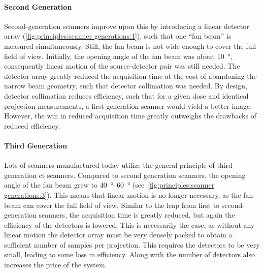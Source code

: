\documentclass[../ml-tct.tex]{subfiles}
\begin{document}
\paragraph{Second Generation} Second-generation scanners improve upon this by introducing a linear detector array (\cref{fig:principles:scanner generations:1}), such that one \enquote{fan beam} is measured simultaneously.
Still, the fan beam is not wide enough to cover the full field of view.
Initially, the opening angle of the fan beam was about \SI{10}{\degree}, consequently linear motion of the source-detector pair was still needed.
The detector array greatly reduced the acquisition time at the cost of abandoning the narrow beam geometry, such that detector collimation was needed.
By design, detector collimation reduces efficiency, such that for a given dose and identical projection measurements, a first-generation scanner would yield a better image.
However, the win in reduced acquisition time greatly outweighs the drawbacks of reduced efficiency.
\paragraph{Third Generation} Lots of scanners manufactured today utilize the general principle of third-generation \gls{ct} scanners.
Compared to second generation scanners, the opening angle of the fan beam grew to \SIrange[range-phrase=--]{40}{60}{\degree} (see~\cref{fig:principles:scanner generations:3}).
This means that linear motion is no longer necessary, as the fan beam can cover the full field of view.
Similar to the leap from first to second-generation scanners, the acquisition time is greatly reduced, but again the efficiency of the detectors is lowered.
This is necessarily the case, as without any linear motion the detector array must be very densely packed to obtain a sufficient number of samples per projection.
This requires the detectors to be very small, leading to some loss in efficiency.
Along with the number of detectors also increases the price of the system.
\end{document}

